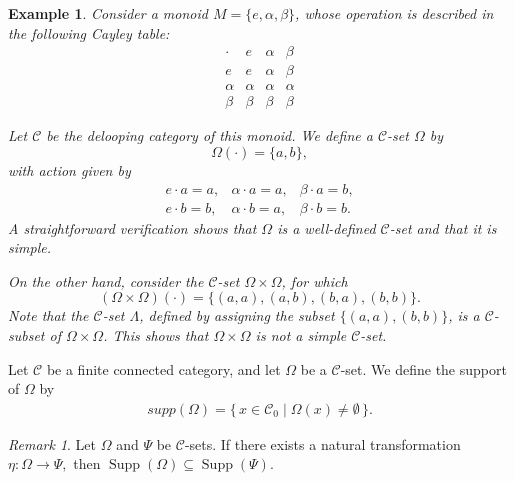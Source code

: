 \documentclass[a4paper]{article}
\newtheorem{exam}[thm]{Example}
\theoremstyle{definition}
\theoremstyle{remark}
\newtheorem{rem}[thm]{Remark}
\newcommand*{\cat}[1]{\mathcal{#1}}
\begin{document}
\begin{exam}
    Consider a monoid $M = \{e, \alpha, \beta\}$, whose operation is described in the following Cayley table:
    \[
        \begin{array}{c|cccc}
        \cdot & e & \alpha & \beta \\
        \hline
        e & e & \alpha & \beta \\
        \alpha & \alpha & \alpha & \alpha \\
        \beta & \beta & \beta & \beta 
        \end{array}
    \]

Let $\cat{C}$ be the delooping category of this monoid. We define a $\cat{C}$-set $\Omega$ by
\[
\Omega(\cdot) = \{a,b\},
\]
with action given by
\[
\begin{array}{ccc}
e \cdot a = a, & \alpha \cdot a = a, & \beta \cdot a = b, \\
e \cdot b = b, & \alpha \cdot b = a, & \beta \cdot b = b.
\end{array}
\]
A straightforward verification shows that $\Omega$ is a well-defined $\cat{C}$-set and that it is simple.

On the other hand, consider the $\cat{C}$-set $\Omega \times \Omega$, for which
\[
(\Omega \times \Omega)(\cdot) = \{(a,a), (a,b), (b,a), (b,b)\}.
\]
Note that the $\cat{C}$-set $\Lambda$, defined by assigning the subset $\{(a,a),(b,b)\}$, is a $\cat{C}$-subset of $\Omega \times \Omega$. This shows that $\Omega \times \Omega$ is not a simple $\cat{C}$-set.
\end{exam}
Let $\cat{C}$ be a finite connected category, and let $\Omega$ be a $\cat{C}$-set. We define the support of $\Omega$ by
\begin{align*}
    supp(\Omega) = \{\, x \in \cat{C}_0 \mid \Omega(x) \neq \emptyset \,\}.
\end{align*}

\begin{rem}
Let $\Omega$ and $\Psi$ be $\cat{C}$-sets. If there exists a natural transformation
$ 
\eta:\Omega\longrightarrow \Psi,
$ 
then $
\operatorname{Supp}(\Omega)\subseteq \operatorname{Supp}(\Psi).
$

\end{rem}
\end{document}
